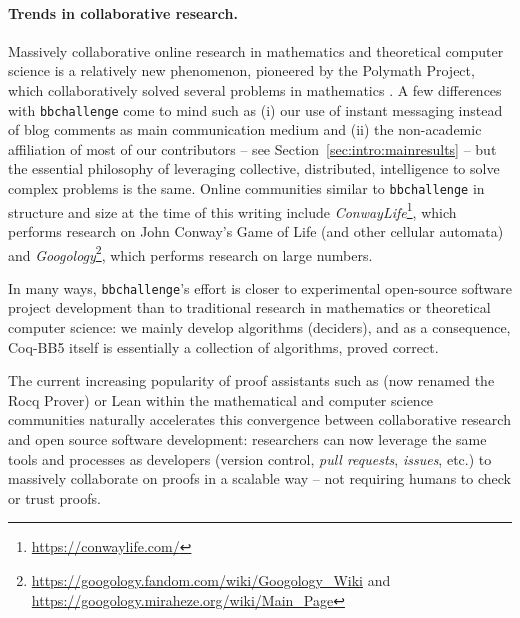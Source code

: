 \documentclass[a4paper,british]{article}
\theoremstyle{definition} %
\numberwithin{equation}{section}
\theoremstyle{definition} %
\newcommand{\CoqBB}{Coq-BB5\xspace}
\begin{document}
\paragraph{Trends in collaborative research.} Massively collaborative online research in mathematics and theoretical computer science is a relatively new phenomenon, pioneered by the Polymath Project, which collaboratively solved several problems in mathematics \cite{Gowers2009}. A few differences with \texttt{bbchallenge} come to mind such as (i) our use of instant messaging instead of blog comments as main communication medium and (ii) the non-academic affiliation of most of our contributors -- see Section~\ref{sec:intro:mainresults} -- but the essential philosophy of leveraging collective, distributed, intelligence to solve complex problems is the same. Online communities similar to \texttt{bbchallenge} in structure and size at the time of this writing include \textit{ConwayLife}\footnote{\url{https://conwaylife.com/}}, which performs research on John Conway's Game of Life (and other cellular automata) and \textit{Googology}\footnote{\url{https://googology.fandom.com/wiki/Googology_Wiki} and \url{https://googology.miraheze.org/wiki/Main_Page}}, which performs research on large numbers.

In many ways, \texttt{bbchallenge}'s effort is closer to experimental open-source software project development than to traditional research in mathematics or theoretical computer science: we mainly develop algorithms (deciders), and as a consequence, \CoqBB itself is essentially a collection of algorithms, proved correct.

The current increasing popularity of proof assistants such as \Coq (now renamed the Rocq Prover) or Lean within the mathematical and computer science communities naturally accelerates this convergence between collaborative research and open source software development: researchers can now leverage the same tools and processes as developers (version control, \textit{pull requests}, \textit{issues}, etc.) to massively collaborate on proofs in a scalable way -- \ie not requiring humans to check or trust proofs.
\end{document}
